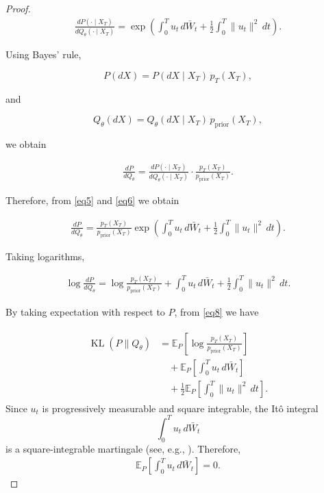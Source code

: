 \documentclass[11pt]{article}
\DeclareMathOperator{\KL}{KL}
\begin{document}
\begin{proof}
\begin{align}
\frac{
dP(\cdot\mid X_T)
}{
dQ_\theta(\cdot\mid X_T)
}
=
\exp\!\left(
\int_0^T
u_t\,d\bar{W}_t
+
\frac12
\int_0^T
\|u_t\|^2\,dt
\right). \label{eq5}
\end{align}

Using Bayes' rule,

\[
P(dX)
=
P(dX\mid X_T)\,p_T(X_T),
\]

and

\[
Q_\theta(dX)
=
Q_\theta(dX\mid X_T)\,
p_{\mathrm{prior}}(X_T),
\]

we obtain

\begin{align}
\frac{dP}{dQ_\theta}
=
\frac{
dP(\cdot\mid X_T)
}{
dQ_\theta(\cdot\mid X_T)
}
\cdot
\frac{
p_T(X_T)
}{
p_{\mathrm{prior}}(X_T)
}. \label{eq6}
\end{align}

Therefore, from \eqref{eq5} and \eqref{eq6} we obtain

\begin{align}
\frac{dP}{dQ_\theta}
=
\frac{
p_T(X_T)
}{
p_{\mathrm{prior}}(X_T)
}
\exp\!\left(
\int_0^T
u_t\,d\bar{W}_t
+
\frac12
\int_0^T
\|u_t\|^2\,dt
\right).
\end{align}

Taking logarithms,

\begin{align}
\log
\frac{dP}{dQ_\theta}
=
\log
\frac{
p_T(X_T)
}{
p_{\mathrm{prior}}(X_T)
}
+
\int_0^T
u_t\,d\bar{W}_t
+
\frac12
\int_0^T
\|u_t\|^2\,dt. \label{eq8}
\end{align}

By taking expectation with respect to $P$, from \eqref{eq8} we have

\begin{align}
\begin{aligned}
\KL(P\|Q_\theta)
&=
\mathbb{E}_P
\!\left[
\log
\frac{
p_T(X_T)
}{
p_{\mathrm{prior}}(X_T)
}
\right]
\\
&\quad+
\mathbb{E}_P
\!\left[
\int_0^T
u_t\,d\bar{W}_t
\right]
\\
&\quad+
\frac12
\mathbb{E}_P
\!\left[
\int_0^T
\|u_t\|^2\,dt
\right].
\end{aligned}
\end{align}
Since $u_t$ is progressively measurable and square integrable,
the It\^o integral
\[
\int_0^T u_t\,d\bar W_t
\]
is a square-integrable martingale (see, e.g.,
\cite[Chapter~3]{Oksendal2003}). Therefore,
\begin{align}
\mathbb E_P
\!\left[
\int_0^T
u_t\,d\bar W_t
\right]
=
0.
\end{align}


\end{proof}
\end{document}
